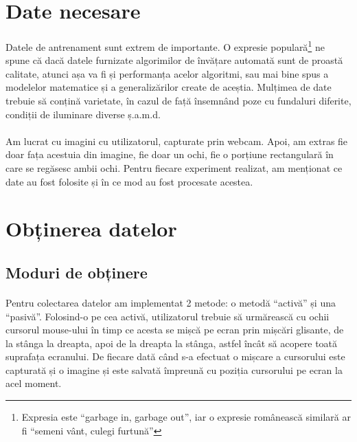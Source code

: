 \section{Date necesare}
\paragraph{}
Datele de antrenament sunt extrem de importante.
O expresie populară\footnote{Expresia este ``garbage in, garbage out'', iar o expresie românească similară ar fi ``semeni vânt, culegi furtună''} ne spune că dacă datele furnizate algorimilor de învățare automată sunt de proastă calitate, atunci așa va fi și performanța acelor algoritmi, sau mai bine spus a modelelor matematice și a generalizărilor create de aceștia.
Mulțimea de date trebuie să conțină varietate, în cazul de față însemnând poze cu fundaluri diferite, condiții de iluminare diverse ș.a.m.d.

\paragraph{}
Am lucrat cu imagini cu utilizatorul, capturate prin webcam.
Apoi, am extras fie doar fața acestuia din imagine, fie doar un ochi, fie o porțiune rectangulară în care se regăsesc ambii ochi.
Pentru fiecare experiment realizat, am menționat ce date au fost folosite și în ce mod au fost procesate acestea.

\section{Obținerea datelor}

\subsection{Moduri de obținere}
\paragraph{}
Pentru colectarea datelor am implementat 2 metode: o metodă ``activă'' și una ``pasivă''.
Folosind-o pe cea activă, utilizatorul trebuie să urmărească cu ochii cursorul mouse-ului în timp ce acesta se mișcă pe ecran prin mișcări glisante, de la stânga la dreapta, apoi de la dreapta la stânga, astfel încât să acopere toată suprafața ecranului.
De fiecare dată când s-a efectuat o mișcare a cursorului este capturată și o imagine și este salvată împreună cu poziția cursorului pe ecran la acel moment.


